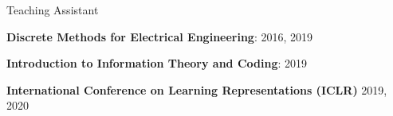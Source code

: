 \begin{cventries}
  \cventryshortshort
    {Teaching Assistant}
    {
      \begin{cvitems}
        \item {\textbf{Discrete Methods for Electrical Engineering}: 2016, 2019 \vspace{.05in}}
        \item {\textbf{Introduction to Information Theory and Coding}: 2019 \vspace{.05in}}
        \item {\textbf{International Conference on Learning Representations (ICLR)} 2019, 2020}
      \end{cvitems}
    }
\end{cventries}